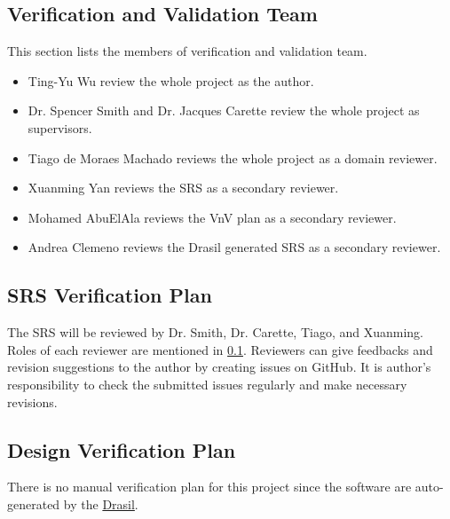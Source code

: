 \documentclass[12pt, titlepage]{article}
\begin{document}
\subsection{Verification and Validation Team} \label{VnVteam}
This section lists the members of verification and validation team.
\begin{itemize}
	\item Ting-Yu Wu review the whole project as the author.
	\item Dr. Spencer Smith and Dr. Jacques Carette review the whole project as 
	supervisors. 
	\item Tiago de Moraes Machado reviews the whole project as a domain 
	reviewer.
	\item Xuanming Yan reviews the SRS as a secondary reviewer.
	\item Mohamed AbuElAla reviews the VnV plan as a secondary reviewer.
	\item Andrea Clemeno reviews the Drasil generated SRS as a secondary 
	reviewer.
\end{itemize}

\subsection{SRS Verification Plan} \label{SRSplan}
The SRS will be reviewed by Dr. Smith, Dr. Carette, Tiago, and Xuanming. Roles 
of each reviewer are mentioned in \ref{VnVteam}. Reviewers can give feedbacks 
and revision suggestions to the author by creating issues on GitHub. It is 
author's responsibility to check the submitted issues regularly and make 
necessary revisions.

\subsection{Design Verification Plan} \label{designplan}
There is no manual verification plan for this project since the software are 
auto-generated by the \href{https://github.com/JacquesCarette/Drasil}{Drasil}. 
\end{document}
